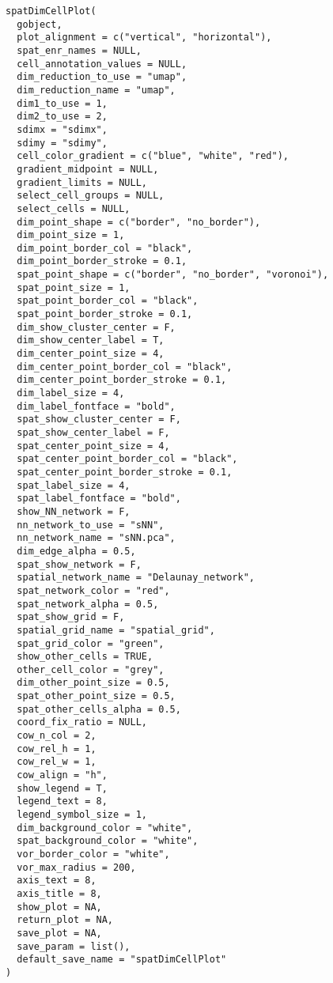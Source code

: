 \documentclass[a4paper]{book}
\begin{document}
\begin{Usage}
\begin{verbatim}
spatDimCellPlot(
  gobject,
  plot_alignment = c("vertical", "horizontal"),
  spat_enr_names = NULL,
  cell_annotation_values = NULL,
  dim_reduction_to_use = "umap",
  dim_reduction_name = "umap",
  dim1_to_use = 1,
  dim2_to_use = 2,
  sdimx = "sdimx",
  sdimy = "sdimy",
  cell_color_gradient = c("blue", "white", "red"),
  gradient_midpoint = NULL,
  gradient_limits = NULL,
  select_cell_groups = NULL,
  select_cells = NULL,
  dim_point_shape = c("border", "no_border"),
  dim_point_size = 1,
  dim_point_border_col = "black",
  dim_point_border_stroke = 0.1,
  spat_point_shape = c("border", "no_border", "voronoi"),
  spat_point_size = 1,
  spat_point_border_col = "black",
  spat_point_border_stroke = 0.1,
  dim_show_cluster_center = F,
  dim_show_center_label = T,
  dim_center_point_size = 4,
  dim_center_point_border_col = "black",
  dim_center_point_border_stroke = 0.1,
  dim_label_size = 4,
  dim_label_fontface = "bold",
  spat_show_cluster_center = F,
  spat_show_center_label = F,
  spat_center_point_size = 4,
  spat_center_point_border_col = "black",
  spat_center_point_border_stroke = 0.1,
  spat_label_size = 4,
  spat_label_fontface = "bold",
  show_NN_network = F,
  nn_network_to_use = "sNN",
  nn_network_name = "sNN.pca",
  dim_edge_alpha = 0.5,
  spat_show_network = F,
  spatial_network_name = "Delaunay_network",
  spat_network_color = "red",
  spat_network_alpha = 0.5,
  spat_show_grid = F,
  spatial_grid_name = "spatial_grid",
  spat_grid_color = "green",
  show_other_cells = TRUE,
  other_cell_color = "grey",
  dim_other_point_size = 0.5,
  spat_other_point_size = 0.5,
  spat_other_cells_alpha = 0.5,
  coord_fix_ratio = NULL,
  cow_n_col = 2,
  cow_rel_h = 1,
  cow_rel_w = 1,
  cow_align = "h",
  show_legend = T,
  legend_text = 8,
  legend_symbol_size = 1,
  dim_background_color = "white",
  spat_background_color = "white",
  vor_border_color = "white",
  vor_max_radius = 200,
  axis_text = 8,
  axis_title = 8,
  show_plot = NA,
  return_plot = NA,
  save_plot = NA,
  save_param = list(),
  default_save_name = "spatDimCellPlot"
)
\end{verbatim}
\end{Usage}
%
\end{document}
